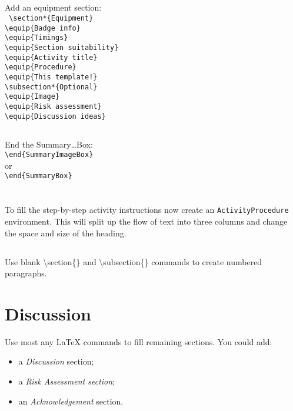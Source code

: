 \documentclass[a4paper]{GreyWolfsScoutActivityTemplate}
\begin{document}
\begin{ActivityProcedure}
\subsection{}
Add an equipment section:\\
{\tt \small{
\textbackslash{}section*\{Equipment\}\\
\textbackslash{}equip\{Badge info\}\\
\textbackslash{}equip\{Timings\}\\
\textbackslash{}equip\{Section suitability\}\\
\textbackslash{}equip\{Activity title\}\\
\textbackslash{}equip\{Procedure\}\\
\textbackslash{}equip\{This template!\}\\
\textbackslash{}subsection*\{Optional\}\\
\textbackslash{}equip\{Image\}\\
\textbackslash{}equip\{Risk assessment\}\\
\textbackslash{}equip\{Discussion ideas\}
}}

\subsection{}
End the Summary\ldots{}Box:\\
{\tt \textbackslash{}end\{SummaryImageBox\}}\\
or\\
{\tt \textbackslash{}end\{SummaryBox\}}

\section{}
To fill the step-by-step activity instructions now create an {\tt ActivityProcedure} environment. This will split up the flow of text into three columns and change the space and size of the heading.

\subsection{}
Use blank \textbackslash{}section\{\} and \textbackslash{}subsection\{\} commands to create numbered paragraphs.

\end{ActivityProcedure}



\section*{Discussion}
Use most any \LaTeX{} commands to fill remaining sections.
You could add:
\begin{itemize}
 \item a \textit{Discussion} section; 
 \item a \textit{Risk Assessment section};
 \item an \textit{Acknowledgement} section.
\end{itemize}
\end{document}
